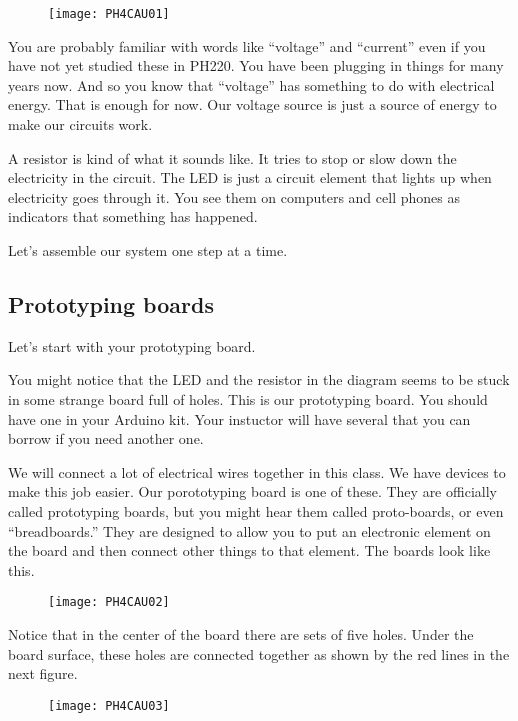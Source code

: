 \begin{figure}[h!]
	\centering
	\texttt{[image: PH4CAU01]}
\end{figure}

You are probably familiar with words like ``voltage'' and ``current'' even if  you have not yet studied these in PH220. You have been plugging in things for many years now. And so you know that ``voltage'' has something to do with electrical energy. That is enough for now. Our voltage source is just a source of energy to make our circuits work.

A resistor is kind of what it sounds like. It tries to stop or slow down the electricity in the circuit. The LED is just a circuit element that lights up
when electricity goes through it. You see them on computers and cell phones as indicators that something has happened.

Let's assemble our system one step at a time.

\subsection{Prototyping boards}

Let's start with your prototyping board.

You might notice that the LED and the resistor in the diagram seems to be
stuck in some strange board full of holes. This is our prototyping board.
You should have one in your Arduino kit. Your instuctor will have several
that you can borrow if you need another one.

We will connect a lot of electrical wires together in this class. We have devices to make this job easier. Our porototyping board is one of these. They are officially
called prototyping boards, but you might hear them called proto-boards, or
even ``breadboards.'' They are designed to allow you to put an electronic element on the board and then connect other things to that element. The boards look like this. 

\begin{figure}[h!]
	\centering
	\texttt{[image: PH4CAU02]}
\end{figure}

Notice that in the center of the board there are sets of five holes. Under the board surface, these holes are connected together as shown by the red lines in the next figure. 

\begin{figure}[h!]
	\centering
	\texttt{[image: PH4CAU03]}
\end{figure} 

